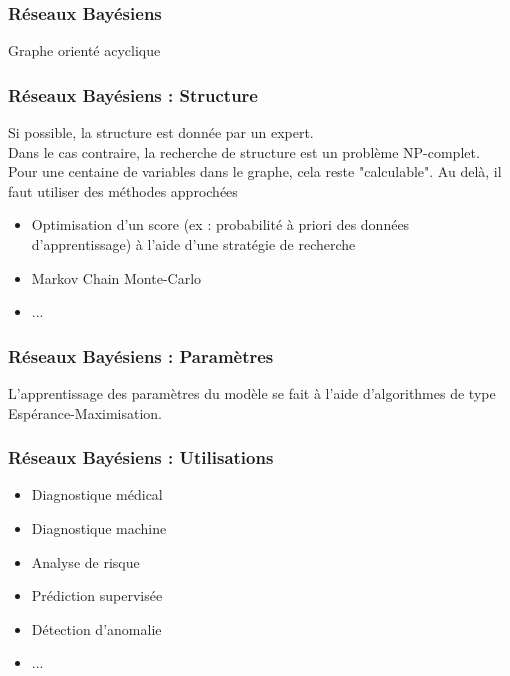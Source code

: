 \begin{frame}
  \frametitle{Réseaux Bayésiens}
  Graphe orienté acyclique
\end{frame}

\begin{frame}
  \frametitle{Réseaux Bayésiens : Structure}
  Si possible, la structure est donnée par un expert. \\
  Dans le cas contraire, la recherche de structure est un problème NP-complet. Pour une centaine de variables dans le graphe, cela reste "calculable". Au delà, il faut utiliser des méthodes approchées
  \begin{itemize}
  \item Optimisation d'un score (ex : probabilité à priori des données d'apprentissage) à l'aide d'une stratégie de recherche
  \item Markov Chain Monte-Carlo
  \item ...
  \end{itemize}
\end{frame}

\begin{frame}
  \frametitle{Réseaux Bayésiens : Paramètres}
  L'apprentissage des paramètres du modèle se fait à l'aide d'algorithmes de type Espérance-Maximisation.
\end{frame}

\begin{frame}
  \frametitle{Réseaux Bayésiens : Utilisations}
  \begin{itemize}
  \item Diagnostique médical
  \item Diagnostique machine
  \item Analyse de risque
  \item Prédiction supervisée
  \item Détection d'anomalie
  \item ...
  \end{itemize}
\end{frame}
